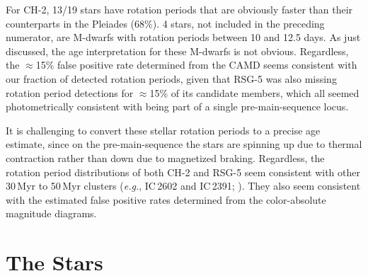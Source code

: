 \documentclass[12pt,twocolumn,linenumbers]{aastex63}
\begin{document}
%
%
%

For CH-2, 13/19 stars have rotation periods that are obviously faster
than their counterparts in the Pleiades (68\%).  4 stars, not included
in the preceding numerator, are M-dwarfs with rotation periods between
10 and 12.5 days.  As just discussed, the age interpretation for these M-dwarfs
is not obvious.  Regardless, the $\approx$15\% false
positive rate determined from the CAMD seems consistent with our
fraction of detected rotation periods, given that RSG-5 was also
missing rotation period detections for $\approx$15\% of its candidate
members, which all seemed photometrically consistent with being part
of a single pre-main-sequence locus.

It is challenging to convert these stellar rotation periods
to a precise age estimate, since on the pre-main-sequence
the stars are spinning up due to thermal contraction
rather than down due to magnetized braking.  Regardless, the rotation
period distributions of both CH-2 and RSG-5 seem consistent with other
30\,Myr to 50\,Myr clusters ({\it e.g.}, IC\,2602 and IC\,2391;
\citealt{douglas_stephanie_t_2021_5131306}).
They also seem consistent with the estimated false positive rates
determined from the color-absolute magnitude diagrams.


\section{The Stars}
\label{sec:stars}
\end{document}
